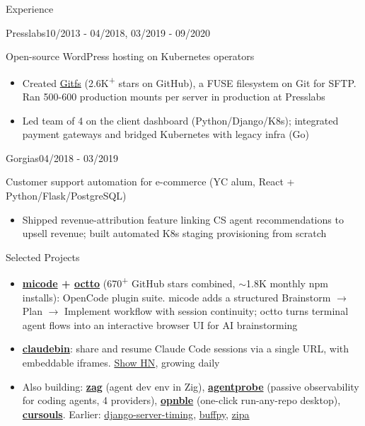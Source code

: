 \documentclass{resume}
\begin{document}
\begin{rSection}{Experience}
\begin{rSubsection}{Presslabs}{10/2013 - 04/2018, 03/2019 - 09/2020}{}{}
        \item Open-source WordPress hosting on Kubernetes operators
        \begin{itemize}
            \setlength\itemsep{-0.4em}
            \item Created \href{https://github.com/presslabs/gitfs}{Gitfs} (2.6K\textsuperscript{+} stars on GitHub), a FUSE filesystem on Git for SFTP. Ran 500-600 production mounts per server in production at Presslabs
            \item Led team of 4 on the client dashboard (Python/Django/K8s); integrated payment gateways and bridged Kubernetes with legacy infra (Go)
        \end{itemize}
    \end{rSubsection}
    \begin{rSubsection}{Gorgias}{04/2018 - 03/2019}{}{}
        \item Customer support automation for e-commerce (YC alum, React + Python/Flask/PostgreSQL)
        \begin{itemize}
            \setlength\itemsep{-0.4em}
            \item Shipped revenue-attribution feature linking CS agent recommendations to upsell revenue; built automated K8s staging provisioning from scratch
        \end{itemize}
    \end{rSubsection}
\end{rSection}

\begin{rSection}{Selected Projects}
    \begin{itemize}
        \setlength\itemsep{-0.3em}
        \item \textbf{\href{https://www.npmjs.com/package/micode}{micode} + \href{https://github.com/vtemian/octto}{octto}} (670\textsuperscript{+} GitHub stars combined, $\sim$1.8K monthly npm installs): OpenCode plugin suite. micode adds a structured Brainstorm $\rightarrow$ Plan $\rightarrow$ Implement workflow with session continuity; octto turns terminal agent flows into an interactive browser UI for AI brainstorming
        \item \textbf{\href{https://claudebin.com}{claudebin}}: share and resume Claude Code sessions via a single URL, with embeddable iframes. \href{https://news.ycombinator.com/item?id=47073488}{Show HN}, growing daily
        \item Also building: \textbf{\href{https://github.com/vtemian/zag}{zag}} (agent dev env in Zig), \textbf{\href{https://www.npmjs.com/package/@agentprobe/core}{agentprobe}} (passive observability for coding agents, 4 providers), \textbf{\href{https://opnble.dev}{opnble}} (one-click run-any-repo desktop), \textbf{\href{https://cursouls.xyz}{cursouls}}. Earlier: \href{https://github.com/vtemian/django-server-timing}{django-server-timing}, \href{https://github.com/vtemian/buffpy}{buffpy}, \href{https://github.com/presslabs/zipa}{zipa}
    \end{itemize}
\end{rSection}
\end{document}

